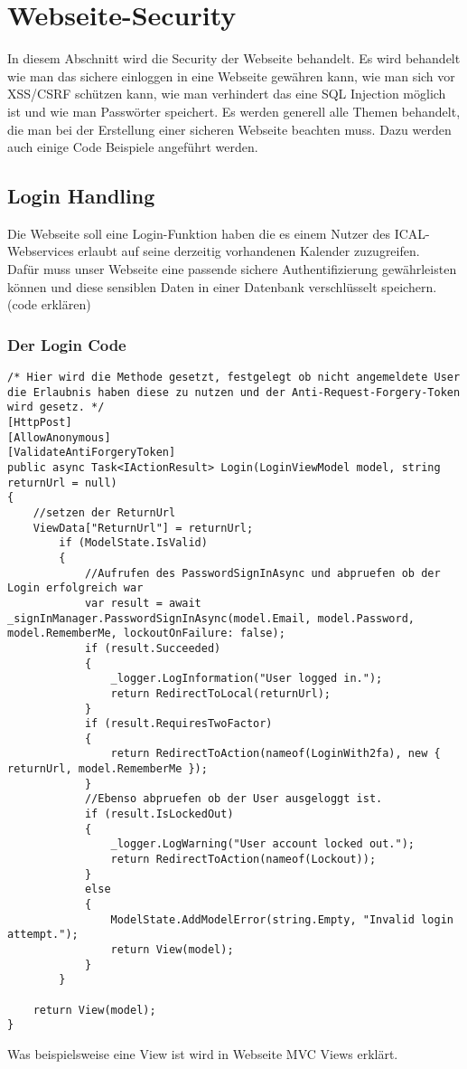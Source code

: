 \renewcommand{\theauthor}{Marcel Stering}
\chapter{Webseite-Security}
\label{sec:Security}
In diesem Abschnitt wird die Security der Webseite behandelt.
Es wird behandelt wie man das sichere einloggen in eine Webseite gewähren kann,
wie man sich vor XSS/CSRF schützen kann, wie man verhindert das eine SQL Injection
möglich ist und wie man Passwörter speichert. Es werden generell alle Themen behandelt, die man bei der Erstellung einer sicheren Webseite beachten muss. Dazu werden auch einige Code Beispiele angeführt werden.
\section{Login Handling}
\label{sec:Login}
Die Webseite soll eine Login-Funktion haben die es einem Nutzer des ICAL-Webservices erlaubt auf seine derzeitig vorhandenen Kalender zuzugreifen.\\Dafür muss unser Webseite eine passende sichere Authentifizierung gewährleisten können und diese sensiblen Daten in einer Datenbank verschlüsselt speichern. 
(code erklären)
\subsection{Der Login Code}
\label{sec:Login_Handling_Code}
\begin{lstlisting}
/* Hier wird die Methode gesetzt, festgelegt ob nicht angemeldete User die Erlaubnis haben diese zu nutzen und der Anti-Request-Forgery-Token wird gesetz. */
[HttpPost]
[AllowAnonymous]
[ValidateAntiForgeryToken]
public async Task<IActionResult> Login(LoginViewModel model, string returnUrl = null)
{
	//setzen der ReturnUrl
    ViewData["ReturnUrl"] = returnUrl;
        if (ModelState.IsValid)
        {
        	//Aufrufen des PasswordSignInAsync und abpruefen ob der Login erfolgreich war
            var result = await _signInManager.PasswordSignInAsync(model.Email, model.Password, model.RememberMe, lockoutOnFailure: false);
            if (result.Succeeded)
            {
                _logger.LogInformation("User logged in.");
                return RedirectToLocal(returnUrl);
            }
            if (result.RequiresTwoFactor)
            {
                return RedirectToAction(nameof(LoginWith2fa), new { returnUrl, model.RememberMe });
            }
            //Ebenso abpruefen ob der User ausgeloggt ist.
            if (result.IsLockedOut)
            {
                _logger.LogWarning("User account locked out.");
                return RedirectToAction(nameof(Lockout));
            }
            else
            {
                ModelState.AddModelError(string.Empty, "Invalid login attempt.");
                return View(model);
            }
        }

    return View(model);
}
\end{lstlisting}
Was beispielsweise eine View ist wird in Webseite MVC Views erklärt. 
